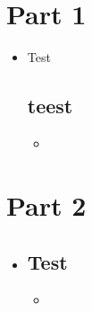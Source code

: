 \documentclass[basic, header]{nosvagor-notes}
\begin{document}
\section{Part 1}
\begin{itemize}
  \item Test
    \subsection{teest}
    \begin{itemize}
      \item
    \end{itemize}

\end{itemize}

\section{Part 2}
\begin{itemize}
  \item[]

  \subsection{Test}
  \begin{itemize}
    \item
  \end{itemize}

\end{itemize}
\end{document}
